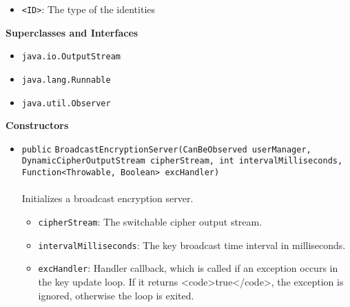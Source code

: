 \begin{itemize}
\item \lstinline|<ID>|: The type of the identities
\end{itemize}


\textbf{\sffamily Superclasses and Interfaces}
\begin{itemize}
\item \lstinline|java.io.OutputStream|
\item \lstinline|java.lang.Runnable|
\item \lstinline|java.util.Observer|
\end{itemize}


\textbf{\sffamily Constructors}
\begin{itemize}
\item \lstinline|public| \lstinline|BroadcastEncryptionServer|\lstinline|(CanBeObserved userManager, DynamicCipherOutputStream cipherStream, int intervalMilliseconds, Function<Throwable, Boolean> excHandler)|\\ \\[-0.6em]
Initializes a broadcast encryption server.
\begin{itemize}
\item \lstinline|cipherStream|: The switchable cipher output stream.
\item \lstinline|intervalMilliseconds|: The key broadcast time interval in milliseconds.
\item \lstinline|excHandler|: Handler callback, which is called if an exception occurs in
                   the key update loop. If it returns <code>true</code>, the
                   exception is ignored, otherwise the loop is exited.
\end{itemize}



\end{itemize}


